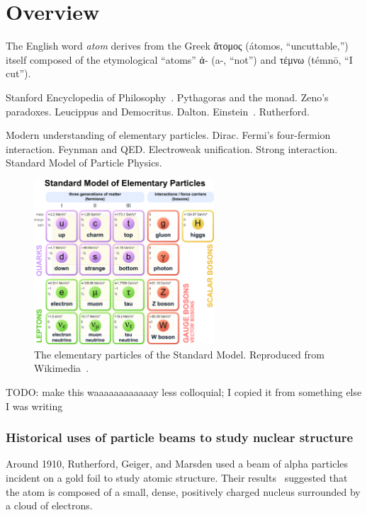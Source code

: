 \section{Overview}

The English word \textit{atom} derives from the Greek
\textgreek{ἄτομος} (átomos, ``uncuttable,'')
itself composed of the etymological ``atoms''
\textgreek{ἀ}- (a-, ``not'')
and
\textgreek{τέμνω } (témnō, ``I cut'').

Stanford Encyclopedia of Philosophy~\cite{sep-atomism-ancient}.
Pythagoras and the monad.
Zeno's paradoxes.
Leucippus and Democritus.
Dalton.
Einstein~\cite{aps_einstein_brownian}.
Rutherford.


Modern understanding of elementary particles.
Dirac.
Fermi's four-fermion interaction.
Feynman and QED.
Electroweak unification.
Strong interaction.
Standard Model of Particle Physics.

\begin{figure}[!h]
    \centering
    \includegraphics[width=0.6\textwidth]{chap1/Standard_Model_of_Elementary_Particles.pdf}
    \caption{The elementary particles of the Standard Model. Reproduced from
             Wikimedia~\cite{standard_model_wikimedia}.
            }
    \label{fig:Standard_Model_of_Elementary_Particles}
\end{figure}

TODO: make this waaaaaaaaaaaay less colloquial; I copied it from something else I was writing
\subsubsection{Historical uses of particle beams to study nuclear structure}
Around 1910, Rutherford, Geiger, and Marsden used a beam of alpha particles
incident on a gold foil to study atomic structure.
Their results~\cite{Rutherford_1911} suggested that the atom is composed of a
small, dense, positively charged nucleus surrounded by a cloud of electrons.

